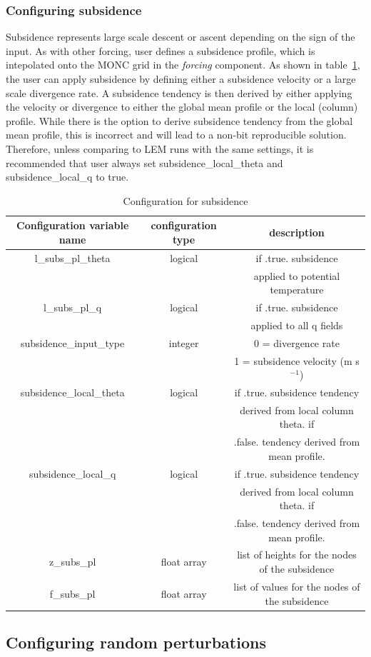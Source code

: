 \documentclass[a4paper,11pt]{article}
\begin{document}
\subsubsection{Configuring subsidence}

Subsidence represents large scale descent or ascent depending on the sign of the
input. As with other forcing, user defines a subsidence profile, which is
intepolated onto the MONC grid in the \emph{forcing} component. As shown in
table~\ref{tab:subsidence}, the user can apply subsidence by defining either a
subsidence velocity or a large scale divergence rate. A subsidence tendency is then
derived by either applying the velocity or divergence to either the global mean profile
or the local (column) profile. While there is the option to derive subsidence
tendency from the global mean profile, this is incorrect and will lead to a
non-bit reproducible solution. Therefore, unless comparing to LEM runs with the
same settings, it is recommended that user always set subsidence\_local\_theta
and subsidence\_local\_q to true.

\begin{table}[H]
\protect\caption{Configuration for subsidence}
\label{tab:subsidence}
\begin{tabular}{|c|c|c|}
\hline
Configuration variable name & configuration type & description\tabularnewline
\hline
\hline
l\_subs\_pl\_theta & logical & if .true. subsidence \tabularnewline
 &  & applied to potential temperature \tabularnewline
\hline
l\_subs\_pl\_q & logical & if .true. subsidence \tabularnewline
 &  & applied to all q fields \tabularnewline
\hline
subsidence\_input\_type & integer & 0 = divergence rate \tabularnewline
 &  & 1 = subsidence velocity (m s$^{-1}$) \tabularnewline
\hline
subsidence\_local\_theta & logical & if .true. subsidence tendency \tabularnewline
 &  & derived from local column theta. if  \tabularnewline
  &  & .false. tendency derived from mean profile.  \tabularnewline
\hline
subsidence\_local\_q & logical & if .true. subsidence tendency \tabularnewline
 &  & derived from local column theta. if  \tabularnewline
 &  & .false. tendency derived from mean profile.  \tabularnewline
\hline
z\_subs\_pl & float array & list of heights for the nodes of the subsidence\tabularnewline
\hline
f\_subs\_pl & float array & list of values for the nodes of the subsidence\tabularnewline
\hline
\end{tabular}
\end{table}

\subsection{Configuring random perturbations}
\end{document}
